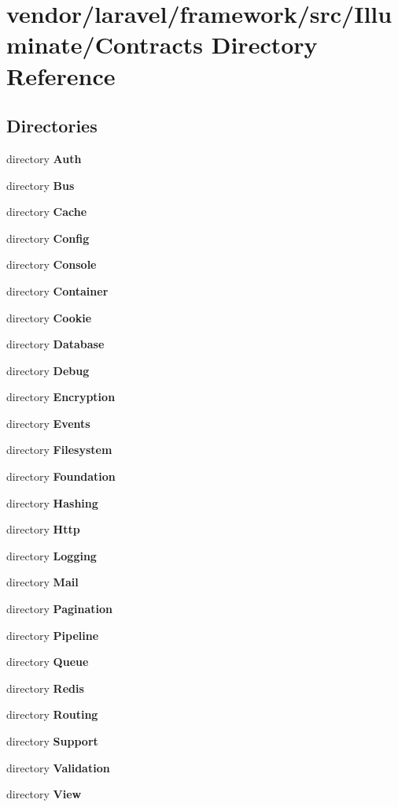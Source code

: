 \section{vendor/laravel/framework/src/\+Illuminate/\+Contracts Directory Reference}
\label{dir_8a2e4d87c11718ccdfd543b3e918a621}
\subsection*{Directories}
\begin{DoxyCompactItemize}
\item 
directory {\bf Auth}
\item 
directory {\bf Bus}
\item 
directory {\bf Cache}
\item 
directory {\bf Config}
\item 
directory {\bf Console}
\item 
directory {\bf Container}
\item 
directory {\bf Cookie}
\item 
directory {\bf Database}
\item 
directory {\bf Debug}
\item 
directory {\bf Encryption}
\item 
directory {\bf Events}
\item 
directory {\bf Filesystem}
\item 
directory {\bf Foundation}
\item 
directory {\bf Hashing}
\item 
directory {\bf Http}
\item 
directory {\bf Logging}
\item 
directory {\bf Mail}
\item 
directory {\bf Pagination}
\item 
directory {\bf Pipeline}
\item 
directory {\bf Queue}
\item 
directory {\bf Redis}
\item 
directory {\bf Routing}
\item 
directory {\bf Support}
\item 
directory {\bf Validation}
\item 
directory {\bf View}
\end{DoxyCompactItemize}

